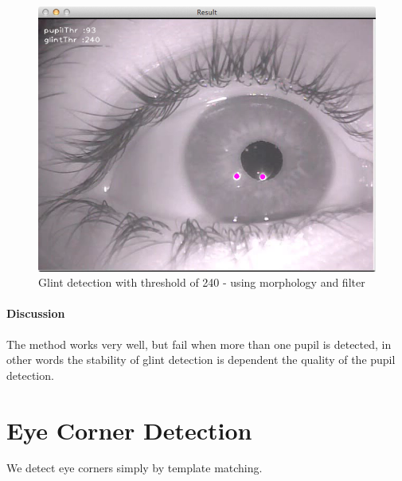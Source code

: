 \documentclass[a4paper,11pt]{article}
\begin{document}
\begin{figure}[H]
\centering
\includegraphics[width=.6\linewidth]{glint_filtered}
\caption{Glint detection with threshold of 240 - using morphology and filter}
\label{fig:glint_filtered}
\end{figure}

\paragraph{Discussion} The method works very well, but fail when more than one pupil is detected, in other words the stability of glint detection is dependent the quality of the pupil detection.




\section{Eye Corner Detection}
We detect eye corners simply by template matching.
\end{document}
